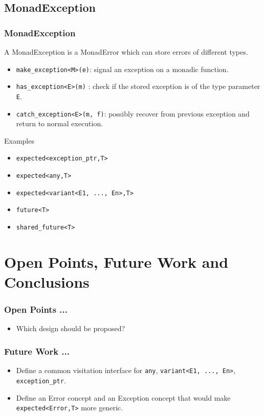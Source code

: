 \documentclass[xcolor=dvipsnames]{beamer}
\newcommand{\cpp}[1]{\lstinline{#1}}
\begin{document}
\subsection{MonadException}
\begin{frame}[fragile]
\frametitle{MonadException}

A MonadException is a MonadError which can store errors of different types.

\begin{itemize}
  \item \cpp{make_exception<M>(e)}: signal an exception on a monadic function.
  \item \cpp{has_exception<E>(m)} : check if the stored exception is of the type parameter \cpp{E}.
  \item \cpp{catch_exception<E>(m, f)}: possibly recover from previous exception and return to normal execution.
\end{itemize}

Examples
\begin{itemize}
  \item \cpp{expected<exception_ptr,T>} 
  \item \cpp{expected<any,T>} 
  \item \cpp{expected<variant<E1, ..., En>,T>} 
  \item \cpp{future<T>} 
  \item \cpp{shared_future<T>} 
\end{itemize}
\end{frame}
\section{Open Points, Future Work and Conclusions}
\begin{frame}
\frametitle{Open Points ...}

\begin{itemize}
  \item Which design should be proposed?
\end{itemize}

\end{frame}
\begin{frame}
\frametitle{Future Work ...}

\begin{itemize}
  \item Define a common visitation interface for \cpp{any}, \cpp{variant<E1, ..., En>}, \cpp{exception_ptr}.
  \item Define an Error concept and an Exception concept that would make \cpp{expected<Error,T>} more generic.
\end{itemize}

\end{frame}
\end{document}
